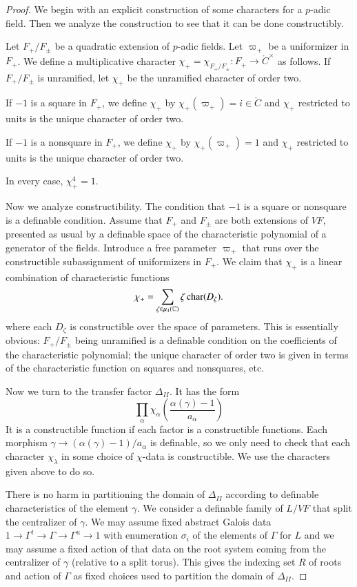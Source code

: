 \begin{proof}  
  We begin with an explicit construction of some characters for a
  $p$-adic field.  Then we analyze the construction to see that it can
  be done constructibly.

  Let $F_+/F_\pm$ be a quadratic extension of $p$-adic fields.  Let
  $\varpi_+$ be a uniformizer in $F_+$.  We define a multiplicative
  character $\chi_+ = \chi_{F_+/F_{\pm}}:F_+\to \ring{C}^\times$ as
  follows.  If $F_+/F_\pm$ is unramified, let $\chi_+$ be the
  unramified character of order two.

  If $-1$ is a square in $F_+$, we define $\chi_+$ by
  $\chi_+(\varpi_+) = i\in\ring{C}$ and $\chi_+$ restricted to units
  is the unique character of order two.

  If $-1$ is a nonsquare in $F_+$, we define $\chi_+$ by
  $\chi_+(\varpi_+)=1$ and $\chi_+$ restricted to units is the unique
  character of order two.

  In every case, $\chi_+^4 = 1$.

  Now we analyze constructibility.  The condition that $-1$ is a
  square or nonsquare is a definable condition.  Assume that $F_+$ and
  $F_\pm$ are both extensions of $VF$, presented as usual by a
  definable space of the characteristic polynomial of a generator of
  the fields.  Introduce a free parameter $\varpi_+$ that runs over
  the constructible subassignment of uniformizers in $F_+$.  We claim
  that $\chi_+$ is a linear combination of characteristic functions
\[
\chi_+ = \sum_{\zeta\in\mu_4(\mathbb{C})} \zeta\, {\operatorname{char}}(D_\zeta).
\]
where each $D_\zeta$ is constructible over the space of parameters.
This is essentially obvious: $F_+/F_\pm$ being unramified is a
definable condition on the coefficients of the characteristic
polynomial; the unique character of order two is given in terms of the
characteristic function on squares and nonsquares, etc.

Now we turn to the transfer factor $\Delta_{II}$.  It has the form
\[
\prod_\alpha \chi_\alpha
\left(\frac{\alpha(\gamma)-1}{a_\alpha}\right)
\]
It is a constructible function if each factor is a constructible
functions. Each morphism $\gamma\to(\alpha(\gamma)-1)/a_\alpha$ is
definable, so we only need to check that each character $\chi_\lambda$
in some choice of $\chi$-data is constructible.  We use the characters
given above to do so.

There is no harm in partitioning the domain of $\Delta_{II}$ according
to definable characteristics of the element $\gamma$.  We consider a
definable family of $L/VF$ that split the centralizer of $\gamma$.  We
may assume fixed abstract Galois data $1\to\Gamma^t\to\Gamma\to
\Gamma^u\to 1$ with enumeration $\sigma_i$ of the elements of $\Gamma$
for $L$ and we may assume a fixed action of that data on the root
system coming from the centralizer of $\gamma$ (relative to a split
torus).  This gives the indexing set $R$ of roots and action of
$\Gamma$ as fixed choices used to partition the domain of
$\Delta_{II}$.


\end{proof}
